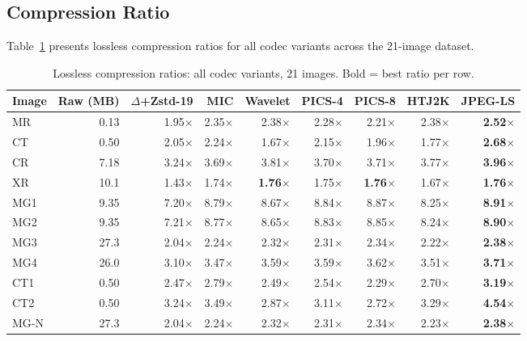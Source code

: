 \documentclass[journal]{IEEEtran}
\begin{document}
\subsection{Compression Ratio}

Table~\ref{tab:ratios} presents lossless compression ratios for all codec
variants across the 21-image dataset.

\begin{table}[t]
\centering
\caption{Lossless compression ratios: all codec variants, 21 images. Bold =
best ratio per row.}
\label{tab:ratios}
\scriptsize
\begin{tabular}{lrrrrrrrr}
\toprule
Image & Raw (MB) & $\Delta$+Zstd-19 & MIC & Wavelet & PICS-4 & PICS-8 & HTJ2K & JPEG-LS \\
\midrule
MR   & 0.13 & 1.95$\times$ & 2.35$\times$ & 2.38$\times$ & 2.28$\times$ & 2.21$\times$ & 2.38$\times$ & \textbf{2.52$\times$} \\
CT   & 0.50 & 2.05$\times$ & 2.24$\times$ & 1.67$\times$ & 2.15$\times$ & 1.96$\times$ & 1.77$\times$ & \textbf{2.68$\times$} \\
CR   & 7.18 & 3.24$\times$ & 3.69$\times$ & 3.81$\times$ & 3.70$\times$ & 3.71$\times$ & 3.77$\times$ & \textbf{3.96$\times$} \\
XR   & 10.1 & 1.43$\times$ & 1.74$\times$ & \textbf{1.76$\times$} & 1.75$\times$ & \textbf{1.76$\times$} & 1.67$\times$ & \textbf{1.76$\times$} \\
MG1  & 9.35 & 7.20$\times$ & 8.79$\times$ & 8.67$\times$ & 8.84$\times$ & 8.87$\times$ & 8.25$\times$ & \textbf{8.91$\times$} \\
MG2  & 9.35 & 7.21$\times$ & 8.77$\times$ & 8.65$\times$ & 8.83$\times$ & 8.85$\times$ & 8.24$\times$ & \textbf{8.90$\times$} \\
MG3  & 27.3 & 2.04$\times$ & 2.24$\times$ & 2.32$\times$ & 2.31$\times$ & 2.34$\times$ & 2.22$\times$ & \textbf{2.38$\times$} \\
MG4  & 26.0 & 3.10$\times$ & 3.47$\times$ & 3.59$\times$ & 3.59$\times$ & 3.62$\times$ & 3.51$\times$ & \textbf{3.71$\times$} \\
CT1  & 0.50 & 2.47$\times$ & 2.79$\times$ & 2.49$\times$ & 2.54$\times$ & 2.29$\times$ & 2.70$\times$ & \textbf{3.19$\times$} \\
CT2  & 0.50 & 3.24$\times$ & 3.49$\times$ & 2.87$\times$ & 3.11$\times$ & 2.72$\times$ & 3.29$\times$ & \textbf{4.54$\times$} \\
MG-N & 27.3 & 2.04$\times$ & 2.24$\times$ & 2.32$\times$ & 2.31$\times$ & 2.34$\times$ & 2.23$\times$ & \textbf{2.38$\times$} \\

\end{tabular}
\end{table}
\end{document}
